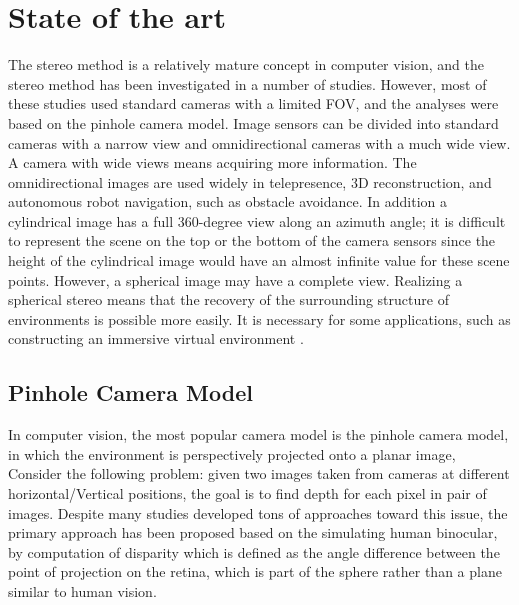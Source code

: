 \documentclass[english, LaM, oneside]{sapthesis}%
\begin{document}
\chapter{State of the art}
\label{chap:1} 

The stereo method is a relatively mature concept in computer vision, and the stereo method has been investigated in a number of studies. However, most of these studies used standard cameras with a limited FOV, and the analyses were based on the pinhole camera model. Image sensors can be divided into standard cameras with a narrow view and omnidirectional cameras with a much wide view. A camera with wide views means acquiring more information. The omnidirectional images are used widely in telepresence, 3D reconstruction, and autonomous robot navigation, such as obstacle avoidance. In addition a cylindrical image has a full 360-degree view along an azimuth angle; it is difficult to represent the scene on the top or the bottom of the camera sensors since the height of the cylindrical image would have an almost infinite value for these scene points. However, a spherical image may have a complete view. Realizing a spherical stereo means that the recovery of the surrounding structure of environments is possible more easily. It is necessary for some applications, such as constructing an immersive virtual environment \cite{ref:Spherical stereo, ref:Binocular spherical}.


\section{Pinhole Camera Model}
\label{sec:caso}
\newcommand\textsub[1]{\stackengine{-.5ex}{}{\scriptsize#1}{O}{l}{F}{F}{L}}

In computer vision, the most popular camera model is the pinhole camera model, in which the environment is perspectively projected onto a planar image, Consider the following problem: given two images taken from cameras at different horizontal/Vertical positions, the goal is to find depth for each pixel in pair of images. Despite many studies developed tons of approaches toward this issue, the primary approach has been proposed based on the simulating human binocular, by computation of disparity which is defined as the angle difference between the point of projection on the retina, which is part of the sphere rather than a plane similar to human vision\cite{ref:Spherical stereo}.
\end{document}
